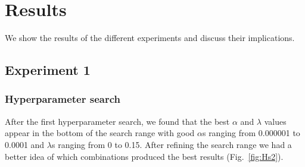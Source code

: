\chapter{Results}
\label{ch:Results}
We show the results of the different experiments and discuss their implications.

\section{Experiment 1}
\subsection{Hyperparameter search}
After the first hyperparameter search, we found that the best $\alpha$ and $\lambda$ values appear in the bottom of the search range with good $\alpha$s ranging from 0.000001 to 0.0001 and $\lambda$s ranging from 0 to 0.15. After refining the search range we had a better idea of which combinations produced the best results (Fig.~\ref{fig:Hs2}).
